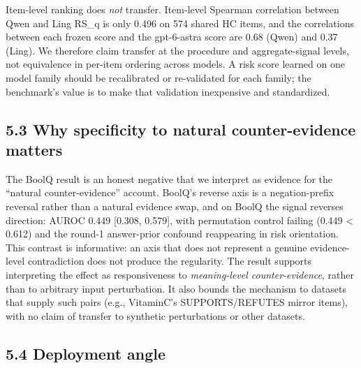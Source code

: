 \documentclass[11pt]{article}
\begin{document}
Item-level ranking does \emph{not} transfer. Item-level Spearman correlation between Qwen and Ling RS\_q is only 0.496 on 574 shared HC items, and the correlations between each frozen score and the gpt-6-astra score are 0.68 (Qwen) and 0.37 (Ling). We therefore claim transfer at the procedure and aggregate-signal levels, not equivalence in per-item ordering across models. A risk score learned on one model family should be recalibrated or re-validated for each family; the benchmark's value is to make that validation inexpensive and standardized.

\subsection{5.3 Why specificity to natural counter-evidence matters}

The BoolQ result is an honest negative that we interpret as evidence for the “natural counter-evidence” account. BoolQ's reverse axis is a negation-prefix reversal rather than a natural evidence swap, and on BoolQ the signal reverses direction: AUROC 0.449 [0.308, 0.579], with permutation control failing (0.449 < 0.612) and the round-1 answer-prior confound reappearing in risk orientation. This contrast is informative: an axis that does not represent a genuine evidence-level contradiction does not produce the regularity. The result supports interpreting the effect as responsiveness to \emph{meaning-level counter-evidence}, rather than to arbitrary input perturbation. It also bounds the mechanism to datasets that supply such pairs (e.g., VitaminC's SUPPORTS/REFUTES mirror items), with no claim of transfer to synthetic perturbations or other datasets.

\subsection{5.4 Deployment angle}
\end{document}
